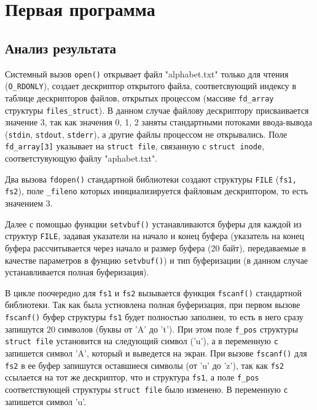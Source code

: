\chapter{Первая программа}

\vspace{-0.5cm}


\clearpage
{}


\vspace{-0.7cm}
\section*{Анализ результата}
\vspace{-0.2cm}

Системный вызов \texttt{open()} открывает файл "alphabet.txt" только для
чтения (\texttt{O\_RDONLY}), создает дескриптор открытого файла, соответсвующий
индексу в таблице дескрипторов файлов, открытых процессом (массиве
\texttt{fd\_array } структуры \texttt{files\_struct}).  В данном случае файлову
дескриптору присваивается значение 3, так как значения 0, 1, 2 заняты
стандартными потоками ввода-вывода (\texttt{stdin}, \texttt{stdout},
\texttt{stderr}), а другие файлы процессом не открывались. Поле
\texttt{fd\_array[3]} указывает на \texttt{struct file}, связанную с
\texttt{struct inode}, соответстувующую файлу "aphabet.txt".

Два вызова \texttt{fdopen()} стандартной библиотеки создают структуры
\texttt{FILE} (\texttt{fs1, fs2}), поле \texttt{\_fileno} которых
инициализируется файловым дескриптором, то есть значением 3.

Далее с помощью функции \texttt{setvbuf()} устанавливаются буферы для каждой из
структур \texttt{FILE}, задавая указатели на начало и конец буфера (указатель на
конец буфера рассчитывается через начало и размер буфера (20 байт), передаваемые
в качестве параметров в фунцию \texttt{setvbuf()}) и тип буферизации (в данном
случае устанавливается полная буферизация).

В цикле поочередно для \texttt{fs1} и \texttt{fs2} вызывается функция
\texttt{fscanf()} стандартной библиотеки. Так как была устновлена полная
буферизация, при первом вызове \texttt{fscanf()} буфер структуры
\texttt{fs1} будет полностью заполнен, то есть в него сразу запишутся 20
символов (буквы от 'A' до 't'). При этом поле \texttt{f\_pos} структуры
\texttt{struct file} установится на следующий символ ('u'), а в
переменную \texttt{c} запишется символ 'A', который и выведется на экран. При
вызове \texttt{fscanf()} для \texttt{fs2} в ее буфер запишутся оставшиеся
символы (от 'u' до 'z'), так как \texttt{fs2} ссылается на тот же
дескриптор, что и структура \texttt{fs1}, а поле \texttt{f\_pos} соответствующей
структуры \texttt{struct file} было изменено. В переменную \texttt{c} запишется
символ 'u'.

